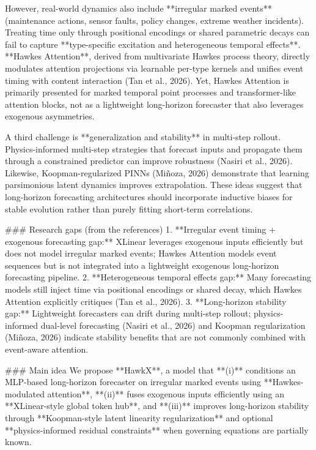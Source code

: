 However, real-world dynamics also include **irregular marked events** (maintenance actions, sensor faults, policy changes, extreme weather incidents). Treating time only through positional encodings or shared parametric decays can fail to capture **type-specific excitation and heterogeneous temporal effects**. **Hawkes Attention**, derived from multivariate Hawkes process theory, directly modulates attention projections via learnable per-type kernels and unifies event timing with content interaction (Tan et al., 2026). Yet, Hawkes Attention is primarily presented for marked temporal point processes and transformer-like attention blocks, not as a lightweight long-horizon forecaster that also leverages exogenous asymmetries.

A third challenge is **generalization and stability** in multi-step rollout. Physics-informed multi-step strategies that forecast inputs and propagate them through a constrained predictor can improve robustness (Nasiri et al., 2026). Likewise, Koopman-regularized PINNs (Miñoza, 2026) demonstrate that learning parsimonious latent dynamics improves extrapolation. These ideas suggest that long-horizon forecasting architectures should incorporate inductive biases for stable evolution rather than purely fitting short-term correlations.

### Research gaps (from the references)  
1. **Irregular event timing + exogenous forecasting gap:** XLinear leverages exogenous inputs efficiently but does not model irregular marked events; Hawkes Attention models event sequences but is not integrated into a lightweight exogenous long-horizon forecasting pipeline.  
2. **Heterogeneous temporal effects gap:** Many forecasting models still inject time via positional encodings or shared decay, which Hawkes Attention explicitly critiques (Tan et al., 2026).  
3. **Long-horizon stability gap:** Lightweight forecasters can drift during multi-step rollout; physics-informed dual-level forecasting (Nasiri et al., 2026) and Koopman regularization (Miñoza, 2026) indicate stability benefits that are not commonly combined with event-aware attention.

### Main idea  
We propose **HawkX**, a model that **(i)** conditions an MLP-based long-horizon forecaster on irregular marked events using **Hawkes-modulated attention**, **(ii)** fuses exogenous inputs efficiently using an **XLinear-style global token hub**, and **(iii)** improves long-horizon stability through **Koopman-style latent linearity regularization** and optional **physics-informed residual constraints** when governing equations are partially known.

